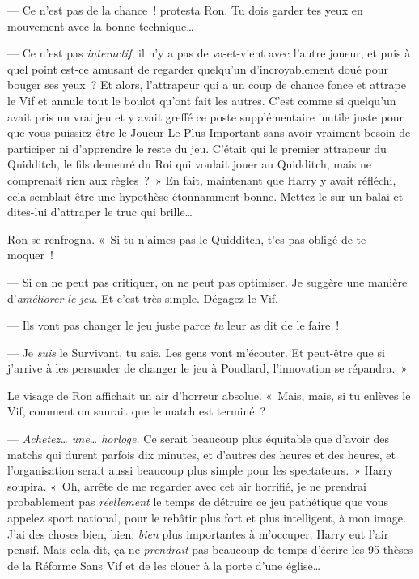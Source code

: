 --- Ce n'est pas de la chance~! protesta Ron. Tu dois garder tes yeux en mouvement avec la bonne technique…

--- Ce n'est pas \emph{interactif}, il n'y a pas de va-et-vient avec l'autre joueur, et puis à quel point est-ce amusant de regarder quelqu'un d'incroyablement doué pour bouger ses yeux~?
Et alors, l'attrapeur qui a un coup de chance fonce et attrape le Vif et annule tout le boulot qu'ont fait les autres.
C'est comme si quelqu'un avait pris un vrai jeu et y avait greffé ce poste supplémentaire inutile juste pour que vous puissiez être le Joueur Le Plus Important sans avoir vraiment besoin de participer ni d'apprendre le reste du jeu.
C'était qui le premier attrapeur du Quidditch, le fils demeuré du Roi qui voulait jouer au Quidditch, mais ne comprenait rien aux règles~?~» 
En fait, maintenant que Harry y avait réfléchi, cela semblait être une hypothèse étonnamment bonne. Mettez-le sur un balai et dites-lui d'attraper le truc qui brille…

Ron se renfrogna.  «~Si tu n'aimes pas le Quidditch, t'es pas obligé de te moquer~!

--- Si on ne peut pas critiquer, on ne peut pas optimiser.
Je suggère une manière d'\emph{améliorer le jeu}.
Et c'est très simple. Dégagez le Vif.

--- Ils vont pas changer le jeu juste parce \emph{tu} leur as dit de le faire~!

--- Je \emph{suis} le Survivant, tu sais. Les gens vont m'écouter. Et peut-être que si j'arrive à les persuader de changer le jeu à Poudlard, l'innovation se répandra.~»

Le visage de Ron affichait un air d'horreur absolue.
«~Mais, mais, si tu enlèves le Vif, comment on saurait que le match est terminé~?

--- \emph{Achetez… une… horloge.} Ce serait beaucoup plus équitable que d'avoir des matchs qui durent parfois dix minutes, et d'autres des heures et des heures, et l'organisation serait aussi beaucoup plus simple pour les spectateurs.~»
Harry soupira. «~Oh, arrête de me regarder avec cet air horrifié, je ne prendrai probablement pas \emph{réellement} le temps de détruire ce jeu pathétique que vous appelez sport national, pour le rebâtir plus fort et plus intelligent, à mon image.
J'ai des choses bien, bien, \emph{bien} plus importantes à m'occuper. Harry eut l'air pensif. Mais cela dit, ça ne \emph{prendrait} pas beaucoup de temps d'écrire les 95 thèses de la Réforme Sans Vif et de les clouer à la porte d'une église…

